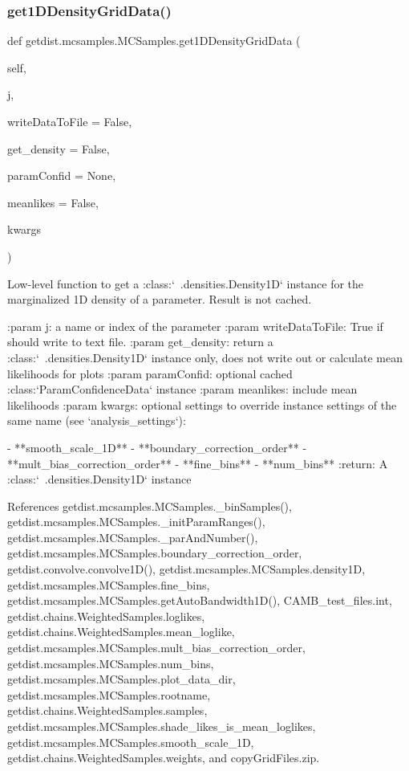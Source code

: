 \subsubsection{\texorpdfstring{get1\+D\+Density\+Grid\+Data()}{get1DDensityGridData()}}
{\footnotesize\ttfamily def getdist.\+mcsamples.\+M\+C\+Samples.\+get1\+D\+Density\+Grid\+Data (\begin{DoxyParamCaption}\item[{}]{self,  }\item[{}]{j,  }\item[{}]{write\+Data\+To\+File = {\ttfamily False},  }\item[{}]{get\+\_\+density = {\ttfamily False},  }\item[{}]{param\+Confid = {\ttfamily None},  }\item[{}]{meanlikes = {\ttfamily False},  }\item[{}]{kwargs }\end{DoxyParamCaption})}

\begin{DoxyVerb}Low-level function to get a :class:`~.densities.Density1D` instance for the marginalized 1D density of a parameter. Result is not cached.

:param j: a name or index of the parameter
:param writeDataToFile: True if should write to text file.
:param get_density: return a :class:`~.densities.Density1D` instance only, does not write out or calculate mean likelihoods for plots
:param paramConfid: optional cached :class:`ParamConfidenceData` instance
:param meanlikes: include mean likelihoods
:param kwargs: optional settings to override instance settings of the same name (see `analysis_settings`):

       - **smooth_scale_1D**
       - **boundary_correction_order**
       - **mult_bias_correction_order**
       - **fine_bins**
       - **num_bins**
:return: A :class:`~.densities.Density1D` instance
\end{DoxyVerb}
 

References getdist.\+mcsamples.\+M\+C\+Samples.\+\_\+bin\+Samples(), getdist.\+mcsamples.\+M\+C\+Samples.\+\_\+init\+Param\+Ranges(), getdist.\+mcsamples.\+M\+C\+Samples.\+\_\+par\+And\+Number(), getdist.\+mcsamples.\+M\+C\+Samples.\+boundary\+\_\+correction\+\_\+order, getdist.\+convolve.\+convolve1\+D(), getdist.\+mcsamples.\+M\+C\+Samples.\+density1D, getdist.\+mcsamples.\+M\+C\+Samples.\+fine\+\_\+bins, getdist.\+mcsamples.\+M\+C\+Samples.\+get\+Auto\+Bandwidth1\+D(), C\+A\+M\+B\+\_\+test\+\_\+files.\+int, getdist.\+chains.\+Weighted\+Samples.\+loglikes, getdist.\+chains.\+Weighted\+Samples.\+mean\+\_\+loglike, getdist.\+mcsamples.\+M\+C\+Samples.\+mult\+\_\+bias\+\_\+correction\+\_\+order, getdist.\+mcsamples.\+M\+C\+Samples.\+num\+\_\+bins, getdist.\+mcsamples.\+M\+C\+Samples.\+plot\+\_\+data\+\_\+dir, getdist.\+mcsamples.\+M\+C\+Samples.\+rootname, getdist.\+chains.\+Weighted\+Samples.\+samples, getdist.\+mcsamples.\+M\+C\+Samples.\+shade\+\_\+likes\+\_\+is\+\_\+mean\+\_\+loglikes, getdist.\+mcsamples.\+M\+C\+Samples.\+smooth\+\_\+scale\+\_\+1D, getdist.\+chains.\+Weighted\+Samples.\+weights, and copy\+Grid\+Files.\+zip.



